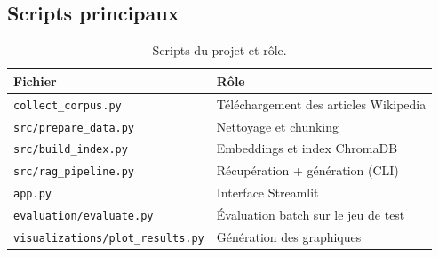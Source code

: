 \subsection{Scripts principaux}

\begin{table}[H]
  \centering
  \caption{Scripts du projet et r\^ole.}
  \label{tab:scripts}
  \small
  \begin{tabular}{@{}p{4.5cm}p{9cm}@{}}
    \toprule
    \textbf{Fichier} & \textbf{R\^ole} \\
    \midrule
    \texttt{collect\_corpus.py} & T\'el\'echargement des articles Wikipedia \\
    \texttt{src/prepare\_data.py} & Nettoyage et chunking \\
    \texttt{src/build\_index.py} & Embeddings et index ChromaDB \\
    \texttt{src/rag\_pipeline.py} & R\'ecup\'eration + g\'en\'eration (CLI) \\
    \texttt{app.py} & Interface Streamlit \\
    \texttt{evaluation/evaluate.py} & \'Evaluation batch sur le jeu de test \\
    \texttt{visualizations/plot\_results.py} & G\'en\'eration des graphiques \\
    \bottomrule
  \end{tabular}
\end{table}

